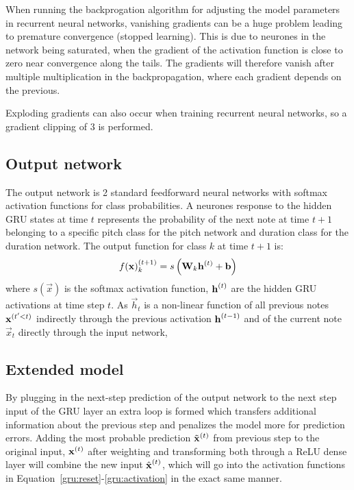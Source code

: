 	When running the backprogation algorithm for adjusting the model parameters in recurrent neural networks, vanishing gradients can be a huge problem leading to premature convergence (stopped learning). This is due to neurones in the network being saturated, when the gradient of the activation function is close to zero near convergence along the tails. The gradients will therefore vanish after multiple multiplication in the backpropagation, where each gradient depends on the previous. 

	Exploding gradients can also occur when training recurrent neural networks, so a gradient clipping of 3 is performed.  

\subsection{Output network} %
\label{sub:output_network}
	The output network is 2 standard feedforward neural networks with softmax activation functions for class probabilities. A neurones response to the hidden GRU states at time $t$ represents the probability of the next note at time $t+1$ belonging to a specific pitch class for the pitch network and duration class for the duration network.
	The output function for class $k$ at time $t+1$ is:
	\begin{equation}
		f(\vec{x})\order{t+1}_k = s\left(\mat{W}_k \vec{h}\order{t} + \vec{b}\right)%
	\end{equation}
	where $s(\vec{x})$ is the softmax activation function, $\bm{\mathrm{h}}^{(t)}$ are the hidden GRU activations at time step $t$. As $\vec{h}_t$ is a non-linear function of all previous notes $\bm{\mathrm{x}}^{(t'<t)}$ indirectly through the previous activation $\bm{\mathrm{h}}^{(t-1)}$ and of the current note $\vec{x}_t$ directly through the input network,    
	
	\subsection{Extended model} %
	\label{sub:extended_model}
		By plugging in the next-step prediction of the output network to the next step input of the GRU layer an extra loop is formed which transfers additional information about the previous step and penalizes the model more for prediction errors.  
		Adding the most probable prediction $\tilde{\bm{\mathrm{x}}}^{(t)}$ from previous step to the original input, $\bm{\mathrm{x}}^{(t)}$ after weighting and transforming both through a ReLU dense layer will combine the new input $\hat{\vec{x}}\order{t}$, which will go into the activation functions in Equation~\eqref{gru:reset}-\eqref{gru:activation} in the exact same manner.

